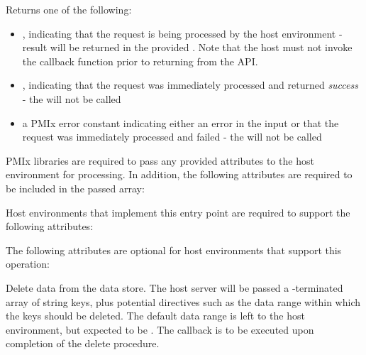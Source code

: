 \begin{arglist}
\end{arglist}

Returns one of the following:

\begin{itemize}
    \item {}, indicating that the request is being processed by the host environment - result will be returned in the provided . Note that the host must not invoke the callback function prior to returning from the \ac{API}.
    \item {}, indicating that the request was immediately processed and returned \textit{success} - the  will not be called
    \item a PMIx error constant indicating either an error in the input or that the request was immediately processed and failed - the  will not be called
\end{itemize}

\reqattrstart
\ac{PMIx} libraries are required to pass any provided attributes to the host environment for processing. In addition, the following attributes are required to be included in the passed  array:


\divider

Host environments that implement this entry point are required to support the following attributes:


\reqattrend

\optattrstart
The following attributes are optional for host environments that support this operation:


\optattrend

\descr

Delete data from the data store.
The host server will be passed a -terminated array of string keys, plus potential directives such as the data range within which the keys should be deleted. The default data range is left to the host environment, but expected to be .
The callback is to be executed upon completion of the delete procedure.

